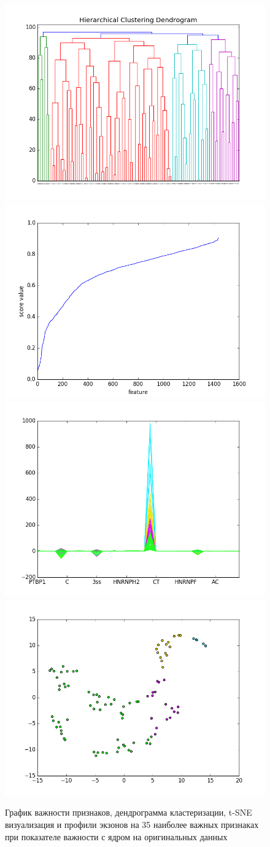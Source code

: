 \begin{figure}[H]
	\includegraphics[width=0.5\linewidth]{pics/dendrograms/spec_unnorm_cosine.png}
	\includegraphics[width=0.5\linewidth]{pics/graphs/spec_unnorm_cosine.png}
	\includegraphics[width=0.5\linewidth]{pics/profiles/spec_unnorm_cosine.png}
	\includegraphics[width=0.5\linewidth]{pics/tsne/spec_unnorm_cosine.png}
	\caption{График важности признаков, дендрограмма кластеризации, t-SNE визуализация и профили экзонов на 35 наиболее важных признаках при показателе важности с ядром на оригинальных данных}
	\label{spec_unnorm_cosine}
\end{figure}


